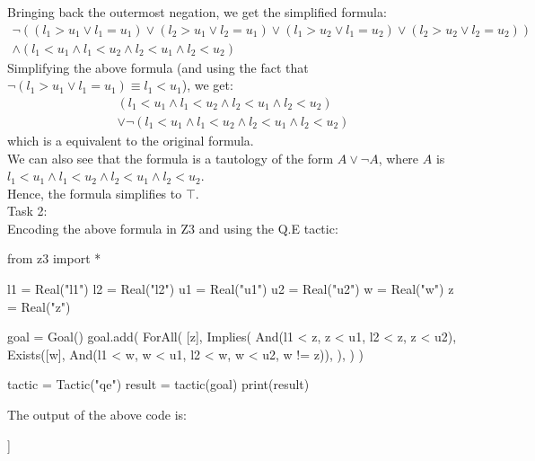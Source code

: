 \documentclass[12pt,letterpaper, onecolumn]{exam}
\begin{document}
\begin{questions}
	Bringing back the outermost negation, we get the simplified formula:
	\begin{align*}
		\neg 
		((l_1 > u_1 \lor l_1 = u_1) \lor (l_2 > u_1 \lor l_2 = u_1) \lor (l_1 > u_2 \lor l_1 = u_2) \lor (l_2 > u_2 \lor l_2 = u_2)) \\
		\land (l_1 < u_1 \land l_1 < u_2 \land l_2 < u_1 \land l_2 < u_2)
	\end{align*}
	Simplifying the above formula (and using the fact that $ \neg (l_1 > u_1 \lor l_1 = u_1) \equiv l_1 < u_1 $), we get:
	\begin{align*}
		(l_1 < u_1 \land l_1 < u_2 \land l_2 < u_1 \land l_2 < u_2) \\
		\lor \neg (l_1 < u_1 \land l_1 < u_2 \land l_2 < u_1 \land l_2 < u_2)
	\end{align*}
	which is a equivalent to the original formula. \\	
	We can also see that the formula is a tautology of the form $ A \lor \neg A $, where $ A $ is $ l_1 < u_1 \land l_1 < u_2 \land l_2 < u_1 \land l_2 < u_2 $. \\
	Hence, the formula simplifies to $ \top $. \\

	Task 2: \\
	Encoding the above formula in Z3 and using the Q.E tactic:
	\begin{python}
		from z3 import *

l1 = Real("l1")
l2 = Real("l2")
u1 = Real("u1")
u2 = Real("u2")
w = Real("w")
z = Real("z")

goal = Goal()
goal.add(
    ForAll(
        [z],
        Implies(
            And(l1 < z, z < u1, l2 < z, z < u2),
            Exists([w], And(l1 < w, w < u1, l2 < w, w < u2, w != z)),
        ),
    )
)

tactic = Tactic("qe")
result = tactic(goal)
print(result)
	\end{python}
	The output of the above code is:
	\begin{python}
[[]]
	\end{python}


\end{questions}
\end{document}
